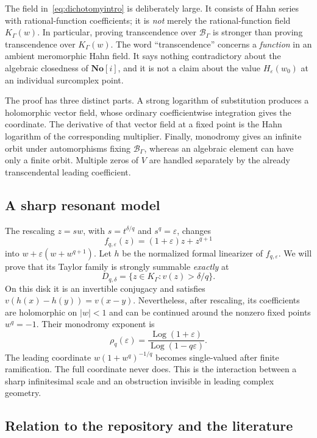 \documentclass[11pt,a4paper]{article}
\numberwithin{equation}{section}
\theoremstyle{definition}
\theoremstyle{remark}
\newcommand{\No}{\mathbf{No}}
\newcommand{\K}{K_\Gamma}
\newcommand{\B}{\mathscr B_\Gamma}
\newcommand{\eps}{\varepsilon}
\newcommand{\Log}{\operatorname{Log}}
\begin{document}
The field in~\eqref{eq:dichotomyintro} is deliberately large.  It consists of
Hahn series with rational-function coefficients; it is \emph{not} merely
the rational-function field $\K(w)$.  In particular, proving transcendence
over $\B$ is stronger than proving transcendence over $\K(w)$.  The word
``transcendence'' concerns a \emph{function} in an ambient meromorphic Hahn
field.  It says nothing contradictory about the algebraic closedness of
$\No[i]$, and it is not a claim about the value $H_\eps(w_0)$ at an individual
surcomplex point.

The proof has three distinct parts.  A strong logarithm of substitution
produces a holomorphic vector field, whose ordinary coefficientwise
integration gives the coordinate.  The derivative of that vector field at a
fixed point is the Hahn logarithm of the corresponding multiplier.  Finally,
monodromy gives an infinite orbit under automorphisms fixing $\B$, whereas an
algebraic element can have only a finite orbit.  Multiple zeros of $V$ are
handled separately by the already transcendental leading coefficient.

\subsection{A sharp resonant model}

The rescaling $z=s w$, with $s=t^{\delta/q}$ and $s^q=\eps$, changes
\begin{equation}\label{eq:originalmodelintro}
 f_{q,\eps}(z)=(1+\eps)z+z^{q+1}
\end{equation}
into $w+\eps(w+w^{q+1})$.  Let $h$ be the normalized formal linearizer of
$f_{q,\eps}$.  We will prove that its Taylor family is strongly summable
\emph{exactly} at
\begin{equation}\label{eq:sharpdomainintro}
 D_{q,\delta}=\{z\in\K:v(z)>\delta/q\}.
\end{equation}
On this disk it is an invertible conjugacy and satisfies
$v(h(x)-h(y))=v(x-y)$.  Nevertheless, after rescaling, its coefficients are
holomorphic on $|w|<1$ and can be continued around the nonzero fixed points
$w^q=-1$.  Their monodromy exponent is
\[
 \rho_q(\eps)=\frac{\Log(1+\eps)}{\Log(1-q\eps)}.
\]
The leading coordinate $w(1+w^q)^{-1/q}$ becomes single-valued after finite
ramification.  The full coordinate never does.  This is the interaction
between a sharp infinitesimal scale and an obstruction invisible in leading
complex geometry.

\subsection{Relation to the repository and the literature}
\label{sec:related}
\end{document}
